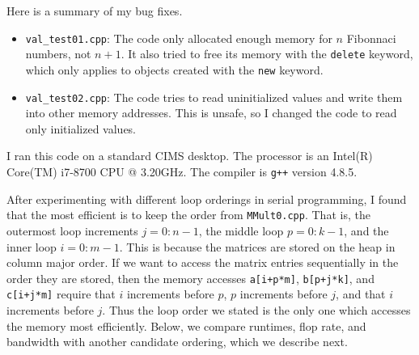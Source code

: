 \begin{questions}



\begin{solution}
    Here is a summary of my bug fixes.
    \begin{itemize}
        \item \texttt{val\_test01.cpp}: The code only allocated enough memory for $n$
        Fibonnaci numbers, not $n+1$. It also tried to free its memory with the 
        \texttt{delete} keyword, which only applies to objects created with the
        \texttt{new} keyword.
        \item \texttt{val\_test02.cpp}: The code tries to read uninitialized values
        and write them into other memory addresses. This is unsafe, so I changed the
        code to read only initialized values.
    \end{itemize}
\end{solution}







\begin{solution}
 	I ran this code on a standard CIMS desktop. The processor is an
    Intel(R) Core(TM) i7-8700 CPU @ 3.20GHz. The compiler is \texttt{g++}
    version 4.8.5.
    
    After experimenting with different loop orderings in serial programming,
    I found that the most efficient is to keep the order from \texttt{MMult0.cpp}.
    That is, the outermost loop increments $j=0:n-1$, the middle loop $p=0:k-1$,
    and the inner loop $i=0:m-1$. This is because the matrices are stored on
    the heap in column major order. If we want to access the matrix entries
    sequentially in the order they are stored, then the memory accesses
    \texttt{a[i+p*m]}, \texttt{b[p+j*k]}, and \texttt{c[i+j*m]} require that
    $i$ increments before $p$, $p$ increments before $j$, and that $i$ increments
    before $j$. Thus the loop order we stated is the only one which accesses
    the memory most efficiently. Below, we compare runtimes, flop rate, and 
    bandwidth with another candidate ordering, which we describe next.
    

\end{solution}
\end{questions}
